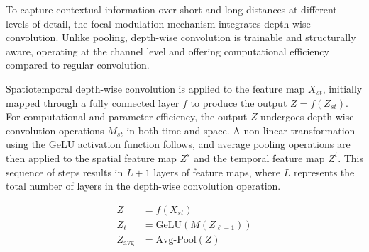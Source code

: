\documentclass[conference,a4paper,english]{IEEEtran}[2015/08/26]
\begin{document}
To capture contextual information over short and long distances at different levels of detail, 
the focal modulation mechanism integrates depth-wise convolution. Unlike pooling, depth-wise convolution is 
trainable and structurally aware, operating at the channel level and offering computational efficiency compared 
to regular convolution.

Spatiotemporal depth-wise convolution is applied to the feature map \(X_{st}\), initially mapped through a 
fully connected layer \(f\) to produce the output \(Z = f(Z_{st})\). For computational and parameter efficiency, 
the output \(Z\) undergoes depth-wise convolution operations \(M_{st}\) in both time and space.
 A non-linear transformation using the GeLU activation function follows, and average pooling operations 
 are then applied to the spatial feature map \(Z^s\) and the temporal feature map \(Z^t\). This sequence 
 of steps results in \(L+1\) layers of feature maps, where \(L\) represents the total number of layers in 
 the depth-wise convolution operation.


\begin{align*}
  Z &= f(X_{st})\tag{10} \\
  Z_\ell &= \text{GeLU}(M(Z_{\ell-1}))\tag{11} \\
  Z_{\text{avg}} &= \text{Avg-Pool}(Z)\tag{12}
  \end{align*}
  

  
\end{document}
